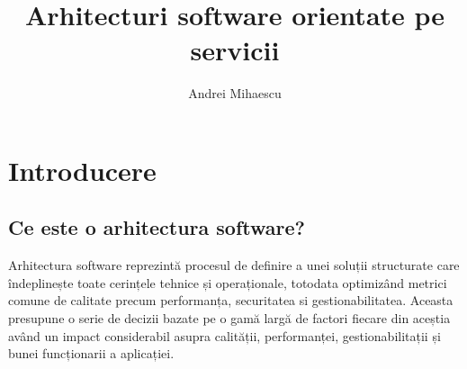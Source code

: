 \documentclass[12pt, a4paper, oneside, romanian]{teza-upb}
\begin{document}
\author{Andrei Mihaescu}

\title{Arhitecturi software orientate pe servicii}




\beforepreface
\listoffigures
\listoftables

\afterpreface 

\chapter{Introducere}
\section{Ce este o arhitectura software?}
Arhitectura software reprezintă procesul de definire a unei soluții structurate care îndeplinește toate cerințele tehnice și operaționale, totodata optimizând metrici comune de calitate precum performanța, securitatea si gestionabilitatea. Aceasta presupune o serie de decizii bazate pe o gamă largă de factori fiecare din aceștia având un impact considerabil asupra calității, performanței, gestionabilitații și bunei funcționarii a aplicației.
\end{document}
